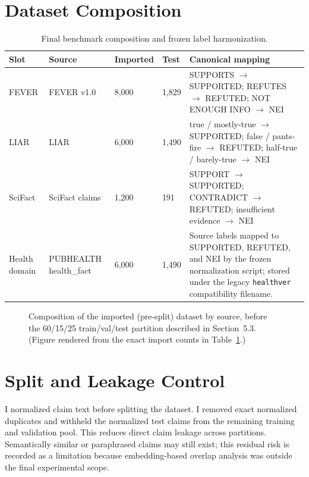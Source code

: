 \documentclass[12pt,a4paper,openany]{report}
\begin{document}
\section{Dataset Composition}
\begin{table}[H]
\centering
\caption{Final benchmark composition and frozen label harmonization.}
\label{tab:composition}
\small
\begin{tabularx}{\textwidth}{p{1.6cm}p{1.8cm}p{1.3cm}p{1.1cm}X}
\toprule
Slot & Source & Imported & Test & Canonical mapping \\
\midrule
FEVER & FEVER v1.0 & 8{,}000 & 1{,}829 & SUPPORTS $\to$ SUPPORTED; REFUTES $\to$ REFUTED; NOT ENOUGH INFO $\to$ NEI \\
LIAR & LIAR & 6{,}000 & 1{,}490 & true / mostly-true $\to$ SUPPORTED; false / pants-fire $\to$ REFUTED; half-true / barely-true $\to$ NEI \\
SciFact & SciFact claims & 1{,}200 & 191 & SUPPORT $\to$ SUPPORTED; CONTRADICT $\to$ REFUTED; insufficient evidence $\to$ NEI \\
Health domain & PUBHEALTH health\_fact & 6{,}000 & 1{,}490 & Source labels mapped to SUPPORTED, REFUTED, and NEI by the frozen normalization script; stored under the legacy \texttt{healthver} compatibility filename. \\
\bottomrule
\end{tabularx}
\end{table}

\begin{figure}[H]
\centering
{}
\caption{Composition of the imported (pre-split) dataset by source, before the 60/15/25 train/val/test partition described in Section~5.3. (Figure rendered from the exact import counts in Table~\ref{tab:composition}.)}
\label{fig:dataset-pie}
\end{figure}

\section{Split and Leakage Control}
I normalized claim text before splitting the dataset. I removed exact normalized duplicates and withheld the normalized test claims from the remaining training and validation pool. This reduces direct claim leakage across partitions. Semantically similar or paraphrased claims may still exist; this residual risk is recorded as a limitation because embedding-based overlap analysis was outside the final experimental scope.
\end{document}
